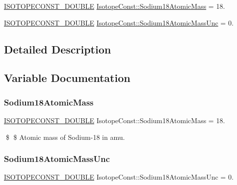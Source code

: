\begin{DoxyCompactItemize}
\item 
\mbox{\hyperlink{group___isotope_const-_macros_ga8f45a7272ce02c0b4c65c44636ed719a}{I\+S\+O\+T\+O\+P\+E\+C\+O\+N\+S\+T\+\_\+\+D\+O\+U\+B\+LE}} \mbox{\hyperlink{group___isotope_const-_sodium-_na18_ga324b5c39929132098187c8cfeef0b27f}{Isotope\+Const\+::\+Sodium18\+Atomic\+Mass}} = 18.
\item 
\mbox{\hyperlink{group___isotope_const-_macros_ga8f45a7272ce02c0b4c65c44636ed719a}{I\+S\+O\+T\+O\+P\+E\+C\+O\+N\+S\+T\+\_\+\+D\+O\+U\+B\+LE}} \mbox{\hyperlink{group___isotope_const-_sodium-_na18_gad8fa2a898def0b26214c3856c05edd29}{Isotope\+Const\+::\+Sodium18\+Atomic\+Mass\+Unc}} = 0.
\end{DoxyCompactItemize}


\subsection{Detailed Description}


\subsection{Variable Documentation}
\mbox{\label{group___isotope_const-_sodium-_na18_ga324b5c39929132098187c8cfeef0b27f}} 
\subsubsection{\texorpdfstring{Sodium18\+Atomic\+Mass}{Sodium18AtomicMass}}
{\footnotesize\ttfamily \mbox{\hyperlink{group___isotope_const-_macros_ga8f45a7272ce02c0b4c65c44636ed719a}{I\+S\+O\+T\+O\+P\+E\+C\+O\+N\+S\+T\+\_\+\+D\+O\+U\+B\+LE}} Isotope\+Const\+::\+Sodium18\+Atomic\+Mass = 18.}

\$ \$ Atomic mass of Sodium-\/18 in amu. \mbox{\label{group___isotope_const-_sodium-_na18_gad8fa2a898def0b26214c3856c05edd29}} 
\subsubsection{\texorpdfstring{Sodium18\+Atomic\+Mass\+Unc}{Sodium18AtomicMassUnc}}
{\footnotesize\ttfamily \mbox{\hyperlink{group___isotope_const-_macros_ga8f45a7272ce02c0b4c65c44636ed719a}{I\+S\+O\+T\+O\+P\+E\+C\+O\+N\+S\+T\+\_\+\+D\+O\+U\+B\+LE}} Isotope\+Const\+::\+Sodium18\+Atomic\+Mass\+Unc = 0.}

